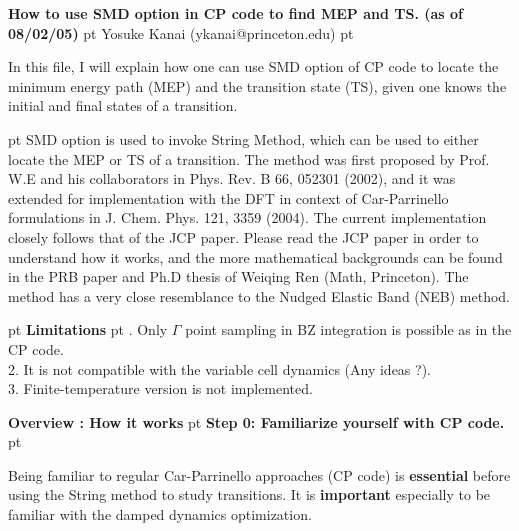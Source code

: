 \documentclass[aps,prb,preprint,groupedaddress]{revtex4}
\begin{document}
\maketitle


\normalsize

\noindent
{\large \bf How to use SMD option in CP code to find MEP and TS. (as of 08/02/05)}
 pt
\noindent
Yosuke Kanai (ykanai@princeton.edu) 
 pt

\noindent
In this file, I will explain how one can use SMD option of CP code to locate
the minimum energy path (MEP) and the transition state (TS), given one knows
the initial and final states of a transition.

 pt
\noindent
SMD option is used to invoke String Method, which can be used to either locate
the MEP or TS of a transition. The method was first proposed by Prof. W.E and 
his collaborators in Phys. Rev. B 66, 052301 (2002), 
and it was extended for implementation with the
DFT in context of Car-Parrinello formulations in J. Chem. Phys. 121, 3359 (2004).
The current implementation closely follows that of the JCP paper.
Please read the JCP paper in order to understand how it works, and the more
mathematical backgrounds can be found in the PRB paper and Ph.D thesis of Weiqing Ren (Math, Princeton).
The method has a very close resemblance to the Nudged Elastic Band (NEB) method.

 pt
\noindent
{\Large \bf Limitations }  
 pt
. Only $\Gamma$ point sampling in BZ integration is possible as in the CP code. \\
2. It is not compatible with the variable cell dynamics (Any ideas ?). \\ 
3. Finite-temperature version is not implemented. 

\newpage
\noindent
{\Large \bf Overview : How it works }
 pt
\noindent
{\bf Step 0: Familiarize yourself with CP code.} \\
 pt
\begin{minipage}{6in} 
Being familiar to regular Car-Parrinello approaches (CP code) is
{\bf essential} before using the String method to study transitions. 
It is {\bf important} especially to be familiar with the damped dynamics optimization.
\end{minipage}
\end{document}
